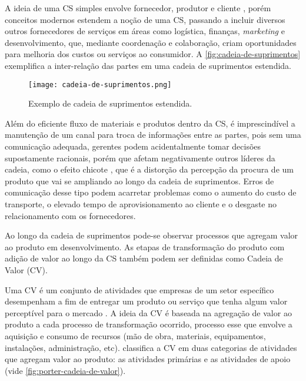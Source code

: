 A ideia de uma CS simples envolve fornecedor, produtor e cliente \cite{hugos2018supplychain}, porém conceitos modernos estendem a noção de uma CS, passando a incluir diversos outros fornecedores de serviços em áreas como logística, finanças, \textit{marketing} e desenvolvimento, que, mediante coordenação e colaboração, criam oportunidades para melhoria dos custos ou serviços ao consumidor. A \autoref{fig:cadeia-de-suprimentos} exemplifica a inter-relação das partes em uma cadeia de suprimentos estendida.

\begin{figure}[htb]
	\centering
	\texttt{[image: cadeia-de-suprimentos.png]}
	\caption{Exemplo de cadeia de suprimentos estendida.}
	\label{fig:cadeia-de-suprimentos}
\end{figure}

Além do eficiente fluxo de materiais e produtos dentro da CS, é imprescindível a manutenção de um canal para troca de informações entre as partes, pois sem uma comunicação adequada, gerentes podem acidentalmente tomar decisões supostamente racionais, porém que afetam negativamente outros líderes da cadeia, como o efeito chicote \cite{lee1997bullwhip}, que é a distorção da percepção da procura de um produto que vai se ampliando ao longo da cadeia de suprimentos. Erros de comunicação desse tipo podem acarretar problemas como o aumento do custo de transporte, o elevado tempo de aprovisionamento ao cliente e o desgaste no relacionamento com os fornecedores.

Ao longo da cadeia de suprimentos pode-se observar processos que agregam valor ao produto em desenvolvimento. As etapas de transformação do produto com adição de valor ao longo da CS também podem ser definidas como Cadeia de Valor (CV).

Uma CV é um conjunto de atividades que empresas de um setor específico desempenham a fim de entregar um produto ou serviço que tenha algum valor perceptível para o mercado \cite{porter1985competitiveadvantage}. A ideia da CV é baseada na agregação de valor ao produto a cada processo de transformação ocorrido, processo esse que envolve a aquisição e consumo de recursos (mão de obra, materiais, equipamentos, instalações, administração, etc).  classifica a CV em duas categorias de atividades que agregam valor ao produto: as atividades primárias e as atividades de apoio (vide \autoref{fig:porter-cadeia-de-valor}).

